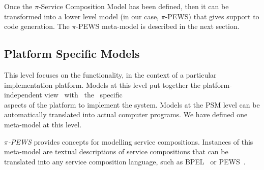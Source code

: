 Once the $\pi$-Service Composition Model has been defined, then it can be transformed into a lower level model (in our case, $\pi$-PEWS) that gives support to code generation. 
The $\pi$-PEWS  meta-model is described in the next section. 


\subsection{Platform Specific Models}

This level focuses on the functionality, in the context of a particular implementation platform.
Models at this level put together the platform-independent view \ with \ the \ specific \\ aspects of the platform to implement the system. 
Models at the PSM level can be automatically translated into actual computer programs. 
We have defined one meta-model at this level.

\textit{$\pi$-PEWS} provides con\-cepts for modelling service compositions. 
Instances of this meta-model are textual descriptions of service compositions that can be translated into any service composition language, such as BPEL~\cite{bpel03} or PEWS~\cite{BaCAM05,Placido2010LTPD}.

